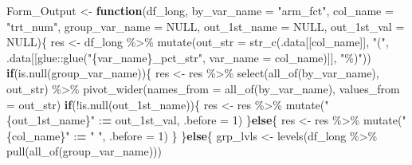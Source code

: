 \documentclass[
]{ctexart}
\newenvironment{Shaded}{\begin{snugshade}}{\end{snugshade}}
\newcommand{\AttributeTok}[1]{\textcolor[rgb]{0.77,0.63,0.00}{#1}}
\newcommand{\ConstantTok}[1]{\textcolor[rgb]{0.00,0.00,0.00}{#1}}
\newcommand{\ControlFlowTok}[1]{\textcolor[rgb]{0.13,0.29,0.53}{\textbf{#1}}}
\newcommand{\DecValTok}[1]{\textcolor[rgb]{0.00,0.00,0.81}{#1}}
\newcommand{\ErrorTok}[1]{\textcolor[rgb]{0.64,0.00,0.00}{\textbf{#1}}}
\newcommand{\FunctionTok}[1]{\textcolor[rgb]{0.00,0.00,0.00}{#1}}
\newcommand{\NormalTok}[1]{#1}
\newcommand{\OtherTok}[1]{\textcolor[rgb]{0.56,0.35,0.01}{#1}}
\newcommand{\SpecialCharTok}[1]{\textcolor[rgb]{0.00,0.00,0.00}{#1}}
\newcommand{\StringTok}[1]{\textcolor[rgb]{0.31,0.60,0.02}{#1}}
\begin{document}
\begin{Shaded}
\begin{Highlighting}[]
\NormalTok{Form\_Output }\OtherTok{\textless{}{-}} \ControlFlowTok{function}\NormalTok{(df\_long, }
                        \AttributeTok{by\_var\_name =} \StringTok{"arm\_fct"}\NormalTok{, }
                        \AttributeTok{col\_name =} \StringTok{"trt\_num"}\NormalTok{, }
                        \AttributeTok{group\_var\_name =} \ConstantTok{NULL}\NormalTok{, }
                        \AttributeTok{out\_1st\_name =} \ConstantTok{NULL}\NormalTok{, }
                        \AttributeTok{out\_1st\_val =} \ConstantTok{NULL}\NormalTok{)\{}
\NormalTok{    res }\OtherTok{\textless{}{-}}\NormalTok{ df\_long }\SpecialCharTok{\%\textgreater{}\%}
        \FunctionTok{mutate}\NormalTok{(}\AttributeTok{out\_str =} \FunctionTok{str\_c}\NormalTok{(.data[[col\_name]], }
                               \StringTok{"("}\NormalTok{, }
\NormalTok{                               .data[[glue}\SpecialCharTok{::}\FunctionTok{glue}\NormalTok{(}\StringTok{"\{var\_name\}\_pct\_str"}\NormalTok{, }
                                                 \AttributeTok{var\_name =}\NormalTok{ col\_name)]], }
                               \StringTok{"\%)"}\NormalTok{))}
    \ControlFlowTok{if}\NormalTok{(}\FunctionTok{is.null}\NormalTok{(group\_var\_name))\{}
\NormalTok{        res }\OtherTok{\textless{}{-}}\NormalTok{ res }\SpecialCharTok{\%\textgreater{}\%}
            \FunctionTok{select}\NormalTok{(}\FunctionTok{all\_of}\NormalTok{(by\_var\_name), out\_str) }\SpecialCharTok{\%\textgreater{}\%}
            \FunctionTok{pivot\_wider}\NormalTok{(}\AttributeTok{names\_from =} \FunctionTok{all\_of}\NormalTok{(by\_var\_name), }
                        \AttributeTok{values\_from =}\NormalTok{ out\_str) }
        \ControlFlowTok{if}\NormalTok{(}\SpecialCharTok{!}\FunctionTok{is.null}\NormalTok{(out\_1st\_name))\{}
\NormalTok{            res }\OtherTok{\textless{}{-}}\NormalTok{ res }\SpecialCharTok{\%\textgreater{}\%}
                \FunctionTok{mutate}\NormalTok{(}\StringTok{"\{out\_1st\_name\}"} \SpecialCharTok{:}\ErrorTok{=}\NormalTok{ out\_1st\_val, }\AttributeTok{.before =} \DecValTok{1}\NormalTok{)}
\NormalTok{        \}}\ControlFlowTok{else}\NormalTok{\{}
\NormalTok{            res }\OtherTok{\textless{}{-}}\NormalTok{ res }\SpecialCharTok{\%\textgreater{}\%}
                \FunctionTok{mutate}\NormalTok{(}\StringTok{"\{col\_name\}"} \SpecialCharTok{:}\ErrorTok{=} \StringTok{" "}\NormalTok{, }\AttributeTok{.before =} \DecValTok{1}\NormalTok{)}
\NormalTok{        \}}
\NormalTok{    \}}\ControlFlowTok{else}\NormalTok{\{}
\NormalTok{        grp\_lvls }\OtherTok{\textless{}{-}} \FunctionTok{levels}\NormalTok{(df\_long }\SpecialCharTok{\%\textgreater{}\%} \FunctionTok{pull}\NormalTok{(}\FunctionTok{all\_of}\NormalTok{(group\_var\_name)))}
        

\end{Highlighting}
\end{Shaded}
\end{document}
